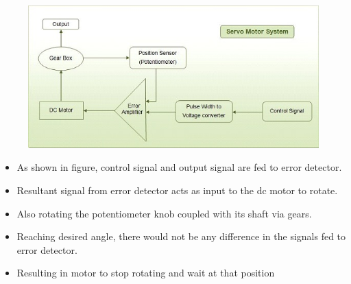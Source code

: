\documentclass[table,10pt,red]{beamer}	%
\begin{document}
\begin{frame}
	\begin{figure}
		
		
		\includegraphics[width=\linewidth]{"Closed loop cs"}
	\end{figure} 
\end{frame}

\begin{frame}
	\begin{itemize}
		
		
		\item
		As shown in figure, control signal and output signal are fed to error detector.
		\pause
		\item
		Resultant signal from error detector acts as input to the dc motor to rotate.
		\pause
		\item
		Also rotating the potentiometer knob coupled with its shaft via gears.
		
		
		\pause
		\item
		Reaching desired angle, there would not be any difference in the signals fed to error detector.
		
		
		\pause
		\item
		Resulting in motor to stop rotating and wait at that position
		
		
	\end{itemize}
\end{frame}
\end{document}
